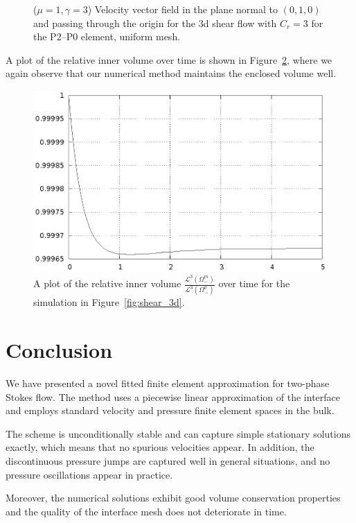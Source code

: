 \documentclass[a4paper,12pt,onecolumn]{article}
\begin{document}
\begin{figure}[htbp]
\centering
{}
\caption{($\mu=1,\gamma=3$) Velocity vector field in the plane normal to 
$(0,1,0)$ and passing through the origin for the 3d shear flow with $C_r=3$ 
for the P2--P0 element, uniform mesh.}
\label{fig:shear_3d_velocity}
\end{figure}
A plot of the relative inner volume over time is shown in 
Figure~\ref{fig:shear_3d_bulk_inner_volume}, where we again observe that our
numerical method maintains the enclosed volume well.

\begin{figure}[htbp]
\centering
\includegraphics[width=.45\textwidth]{figures/3d_shear_bulk_inner_volume.ps}
\caption{A plot of the relative inner volume 
$\frac{\mathcal{L}^3(\Omega^m_-)}{\mathcal{L}^3(\Omega^0_-)}$
over time for the simulation in Figure~\ref{fig:shear_3d}.}
\label{fig:shear_3d_bulk_inner_volume}
\end{figure}

\section{Conclusion}\label{sec:conclusion}
We have presented a novel fitted finite element approximation for two-phase
Stokes flow. The method uses a piecewise linear approximation of the interface
and employs standard velocity and pressure finite element spaces in the bulk.

The scheme is unconditionally stable and can capture simple stationary
solutions exactly, which means that no spurious velocities appear. In addition,
the discontinuous pressure jumps are captured well in general situations, and
no pressure oscillations appear in practice.

Moreover, the numerical solutions exhibit good volume conservation properties
and the quality of the interface mesh does not deteriorate in time.

 

\end{document}
